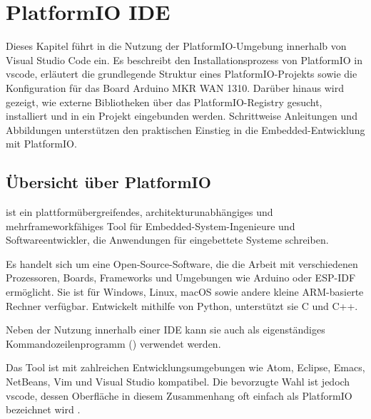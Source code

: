 %
%


\chapter{PlatformIO IDE}


	Dieses Kapitel führt in die Nutzung der PlatformIO-Umgebung innerhalb von Visual Studio Code ein. Es beschreibt den Installationsprozess von PlatformIO in \ac{vscode}, erläutert die grundlegende Struktur eines PlatformIO-Projekts sowie die Konfiguration für das Board Arduino MKR WAN 1310. Darüber hinaus wird gezeigt, wie externe Bibliotheken über das PlatformIO-Registry gesucht, installiert und in ein Projekt eingebunden werden. Schrittweise Anleitungen und Abbildungen unterstützen den praktischen Einstieg in die Embedded-Entwicklung mit PlatformIO.


    
\section{Übersicht über PlatformIO}
	
	 ist ein plattformübergreifendes, architekturunabhängiges und mehrframeworkfähiges Tool für Embedded-System-Ingenieure und Softwareentwickler, die Anwendungen für eingebettete Systeme schreiben.
	
	Es handelt sich um eine Open-Source-Software, die die Arbeit mit verschiedenen Prozessoren, Boards, Frameworks und Umgebungen wie Arduino oder ESP-IDF ermöglicht. Sie ist für Windows, Linux, macOS sowie andere kleine ARM-basierte Rechner verfügbar. Entwickelt mithilfe von Python, unterstützt sie C und C++.
	
	Neben der Nutzung innerhalb einer IDE kann sie auch als eigenständiges Kommandozeilenprogramm () verwendet werden.
	
	Das Tool ist mit zahlreichen Entwicklungsumgebungen wie Atom, Eclipse, Emacs, NetBeans, Vim und Visual Studio kompatibel. Die bevorzugte Wahl ist jedoch \acl{vscode}, dessen Oberfläche in diesem Zusammenhang oft einfach als PlatformIO bezeichnet wird \cite{PlatformIO:2025}.

	
	
